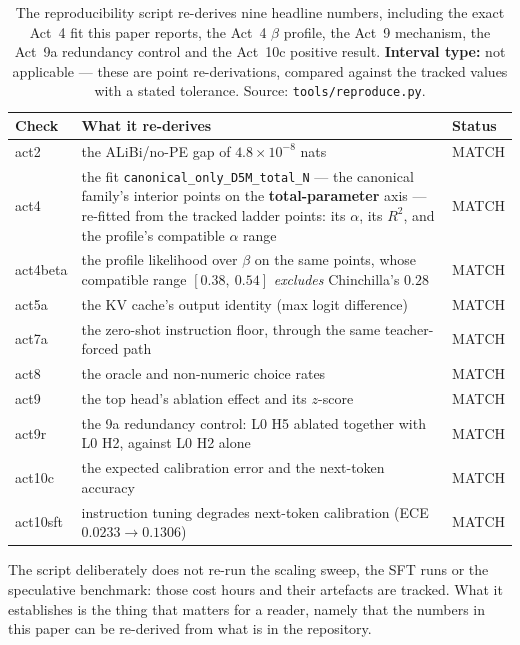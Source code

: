 \documentclass[11pt,a4paper]{article}
\begin{document}
\begin{table}[H]
\centering
\begin{tabular}{L{1.8cm}L{7.2cm}L{4.6cm}}
\toprule
Check & What it re-derives & Status \\
\midrule
act2 & the ALiBi/no-PE gap of $4.8\times10^{-8}$ nats & MATCH \\
act4 & the fit \texttt{canonical\_only\_D5M\_total\_N} --- the canonical family's interior points on the \textbf{total-parameter} axis --- re-fitted from the tracked ladder points: its $\alpha$, its $R^2$, and the profile's compatible $\alpha$ range & MATCH \\
act4beta & the profile likelihood over $\beta$ on the same points, whose compatible range $[0.38,\ 0.54]$ \emph{excludes} Chinchilla's $0.28$ & MATCH \\
act5a & the KV cache's output identity (max logit difference) & MATCH \\
act7a & the zero-shot instruction floor, through the same teacher-forced path & MATCH \\
act8 & the oracle and non-numeric choice rates & MATCH \\
act9 & the top head's ablation effect and its $z$-score & MATCH \\
act9r & the 9a redundancy control: L0 H5 ablated together with L0 H2, against L0 H2 alone & MATCH \\
act10c & the expected calibration error and the next-token accuracy & MATCH \\
act10sft & instruction tuning degrades next-token calibration (ECE $0.0233 \rightarrow 0.1306$) & MATCH \\
\bottomrule
\end{tabular}
\caption{The reproducibility script re-derives nine headline numbers, including
the exact Act~4 fit this paper reports, the Act~4 $\beta$ profile, the Act~9
mechanism, the Act~9a redundancy control and the Act~10c positive result.
\textbf{Interval type:} not applicable --- these are point re-derivations,
compared against the tracked values with a stated tolerance. Source:
\texttt{tools/reproduce.py}.} \label{tab:reproduce}
\end{table}

The script deliberately does not re-run the scaling sweep, the SFT runs or the
speculative benchmark: those cost hours and their artefacts are tracked. What
it establishes is the thing that matters for a reader, namely that the
numbers in this paper can be re-derived from what is in the repository.
\end{document}
